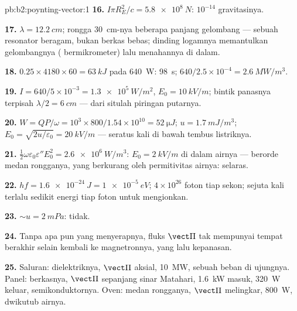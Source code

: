 \begin{solution}{pb:b2:poynting-vector:1}
\textbf{16.} $I\pi R_E^2/c = \qty{5.8e8}{N}$: $10^{-14}$ gravitasinya.

\textbf{17.} $\lambda = \qty{12.2}{cm}$; rongga \qty{30}{cm}-nya beberapa panjang gelombang
--- sebuah resonator beragam, bukan berkas bebas; dinding logamnya memantulkan
gelombangnya ( bermikrometer) lalu menahannya di dalam.

\textbf{18.} $0.25 \times 4180 \times 60 = \qty{63}{kJ}$ pada \qty{640}{W}: \qty{98}{s};
$640/2.5 \times 10^{-4} = \qty{2.6}{MW/m^3}$.

\textbf{19.} $I = 640/5 \times 10^{-3} = \qty{1.3e5}{W/m^2}$, $E_0 = \qty{10}{kV/m}$; bintik panasnya
terpisah $\lambda/2 = \qty{6}{cm}$ --- dari situlah piringan putarnya.

\textbf{20.} $W = QP/\omega = 10^3 \times 800/1.54 \times 10^{10} = \qty{52}{\micro J}$; $u =
\qty{1.7}{mJ/m^3}$; $E_0 = \sqrt{2u/\varepsilon_0} = \qty{20}{kV/m}$ --- seratus kali di bawah
tembus listriknya.

\textbf{21.} $\tfrac12\omega\varepsilon_0\varepsilon''E_0^2 = \qty{2.6e6}{W/m^3}$: $E_0 = \qty{2}{kV/m}$
di dalam airnya --- berorde medan rongganya, yang berkurang oleh
permitivitas airnya: selaras.

\textbf{22.} $hf = \qty{1.6e-24}{J} = \qty{1e-5}{eV}$; $4 \times 10^{26}$ foton tiap sekon;
sejuta kali terlalu sedikit energi tiap foton untuk mengionkan.

\textbf{23.} $\sim u = \qty{2}{mPa}$: tidak.

\textbf{24.} Tanpa apa pun yang menyerapnya, fluks $\vect\Pi$ tak mempunyai
tempat berakhir selain kembali ke magnetronnya, yang lalu kepanasan.

\textbf{25.} Saluran: dielektriknya, $\vect\Pi$ aksial, \qty{10}{MW}, sebuah beban di
ujungnya. Panel: berkasnya, $\vect\Pi$ sepanjang sinar Matahari, \qty{1.6}{kW}
masuk, \qty{320}{W} keluar, semikonduktornya. Oven: medan rongganya, $\vect\Pi$
melingkar, \qty{800}{W}, dwikutub airnya.
\end{solution}
